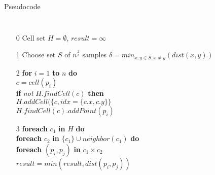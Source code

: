 \documentclass[18pt]{beamer}
\begin{document}
\begin{frame}{Pseudocode}
\begin{columns}
\begin{itemize}\itemsep0pt
\item[\footnotesize 0] Cell set $H = \emptyset$, $result = \infty$\\
						
\vspace{8pt}
\item[\footnotesize 1] Choose set $S$ of $n^{\frac{2}{3}}$ samples
						$\delta = min_{x,y \in S, x \neq y}(dist(x, y))$
\item[\footnotesize 2] \textbf{for} $i = 1$ \textbf{to} $n$ \textbf{do} \\
						\hspace{2em}$c = cell(p_i)$ \\
						\hspace{2em}\textbf{if} \textit{not} $H.findCell(c)$ \textbf{then} \\
						\hspace{4em}$H.addCell(\{c, idx = \{c.x, c.y\}\}$ \\
						\hspace{2em}$H.findCell(c).addPoint(p_i)$ \\
\item[\footnotesize 3] %
						\textbf{foreach} $c_1$ \textbf{in} $H$ \textbf{do} \\
						\hspace{2em} \textbf{foreach} $c_2$ \textbf{in} $\{c_1\} \cup neighbor(c_1)$ \textbf{do} \\
						\hspace{4em} \textbf{foreach} $(p_i,p_j)$ \textbf{in} $c_1 \times c_2$ \\
						\hspace{6em} $result = min(result, dist(p_i, p_j))$
\end{itemize}


\end{columns}
\end{frame}
\end{document}
